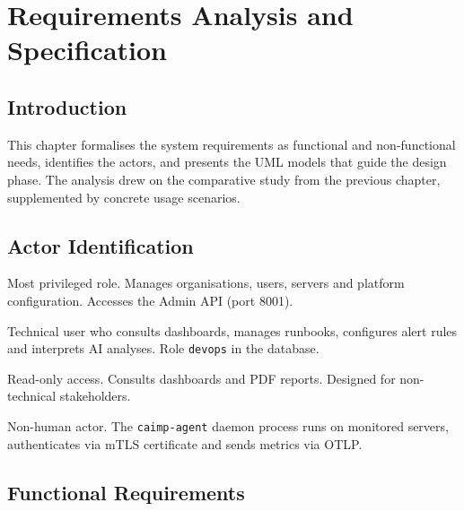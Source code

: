 \chapter{Requirements Analysis and Specification}

\section*{Introduction}

This chapter formalises the system requirements as functional and non-functional
needs, identifies the actors, and presents the UML models that guide the design
phase. The analysis drew on the comparative study from the previous chapter,
supplemented by concrete usage scenarios.

\section{Actor Identification}

\begin{description}[leftmargin=2.5cm, style=nextline]
  \item[\textbf{Administrator}] Most privileged role. Manages organisations, users,
    servers and platform configuration. Accesses the Admin API (port 8001).
  \item[\textbf{Operator}] Technical user who consults dashboards, manages runbooks,
    configures alert rules and interprets AI analyses. Role \texttt{devops} in the database.
  \item[\textbf{Viewer}] Read-only access. Consults dashboards and PDF reports. Designed
    for non-technical stakeholders.
  \item[\textbf{System Agent}] Non-human actor. The \texttt{caimp-agent} daemon process
    runs on monitored servers, authenticates via mTLS certificate and sends metrics via OTLP.
\end{description}

\section{Functional Requirements}

